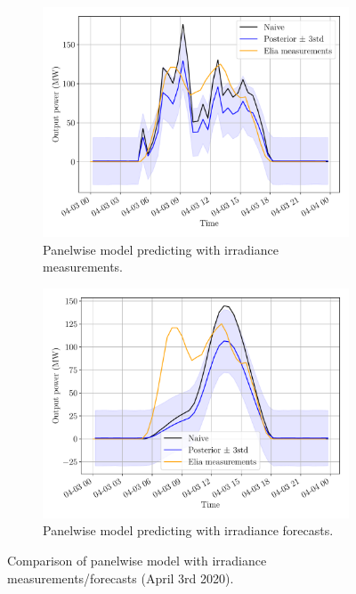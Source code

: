 \documentclass[a4paper, 12pt]{article}
\begin{document}
\begin{figure}[H]
	\centering
	\begin{subfigure}{0.48\textwidth}
		\centering
		\includegraphics[width=\textwidth]{resources/pdf/solar_panelwise_meas_meas (START_FOR 03-04-2020).pdf}
		\caption{Panelwise model predicting with irradiance measurements.}
		\label{fig:panelwise_meas_meas}
	\end{subfigure}
	\hspace{0.5em}
	\begin{subfigure}{0.48\textwidth}
		\centering
		\includegraphics[width=\textwidth]{resources/pdf/solar_panelwise_meas_for (START_FOR 03-04-2020).pdf}
		\caption{Panelwise model predicting with irradiance forecasts.}
		\label{fig:panelwise_meas_for}
	\end{subfigure}
	\caption{Comparison of panelwise model with irradiance measurements/forecasts (April 3rd 2020).}
	\label{fig:comparison_meas_meas_meas_for_panelwise}
\end{figure}
\end{document}
